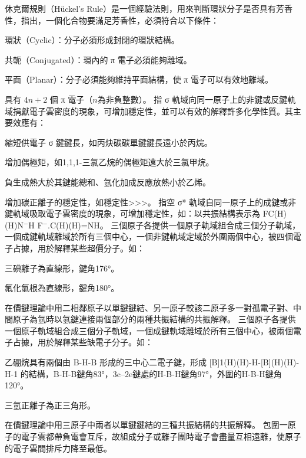 \documentclass[a4paper,12pt]{report}
\begin{document}
休克爾規則（Hückel’s Rule）是一個經驗法則，用來判斷環狀分子是否具有芳香性，指出，一個化合物要滿足芳香性，必須符合以下條件：
\bit
\item 環狀（Cyclic）：分子必須形成封閉的環狀結構。
\item 共軛（Conjugated）：環內的 π 電子必須能夠離域。
\item 平面（Planar）：分子必須能夠維持平面結構，使 π 電子可以有效地離域。
\item 具有 $4n+2$ 個 π 電子（$n$為非負整數）。
\eit
{}
指 σ 軌域向同一原子上的非鍵或反鍵軌域捐獻電子雲密度的現象，可增加穩定性，並可以有效的解釋許多化學性質。其主要效應有：
\bit
\item 縮短供電子 σ 鍵鍵長，如丙炔碳碳單鍵鍵長遠小於丙烷。
\item 增加偶極矩，如1,1,1-三氯乙烷的偶極矩遠大於三氯甲烷。
\item 負生成熱大於其鍵能總和、氫化加成反應放熱小於乙烯。
\item 增加碳正離子的穩定性，如穩定性>>>。
\eit
{}
指空 σ* 軌域自同一原子上的成鍵或非鍵軌域吸取電子雲密度的現象，可增加穩定性，如：以共振結構表示為 FC(H)(H)N$^-$H \ce{<=>} F$^-$.C(H)(H)=NH。
三個原子各提供一個原子軌域組合成三個分子軌域，一個成鍵軌域離域於所有三個中心，一個非鍵軌域定域於外圍兩個中心，被四個電子占據，用於解釋某些超價分子。如：
\bit
\item 三碘離子為直線形，鍵角176°。
\item 氟化氫根為直線形，鍵角180°。
\eit

在價鍵理論中用二相鄰原子以單鍵鍵結、另一原子較該二原子多一對孤電子對、中間原子為氫時以氫鍵連接兩個部分的兩種共振結構的共振解釋。
三個原子各提供一個原子軌域組合成三個分子軌域，一個成鍵軌域離域於所有三個中心，被兩個電子占據，用於解釋某些缺電子分子。如：
\bit
\item 乙硼烷具有兩個由 B-H-B 形成的三中心二電子鍵，形成 [B]1(H)(H)-H-[B](H)(H)-H-1 的結構，B-H-B鍵角83°，3c–2e鍵處的H-B-H鍵角97°，外圍的H-B-H鍵角120°。
\item 三氫正離子為正三角形。
\eit

在價鍵理論中用三原子中兩者以單鍵鍵結的三種共振結構的共振解釋。
包圍一原子的電子雲都帶負電會互斥，故組成分子或離子團時電子會盡量互相遠離，使原子的電子雲間排斥力降至最低。
\end{document}
